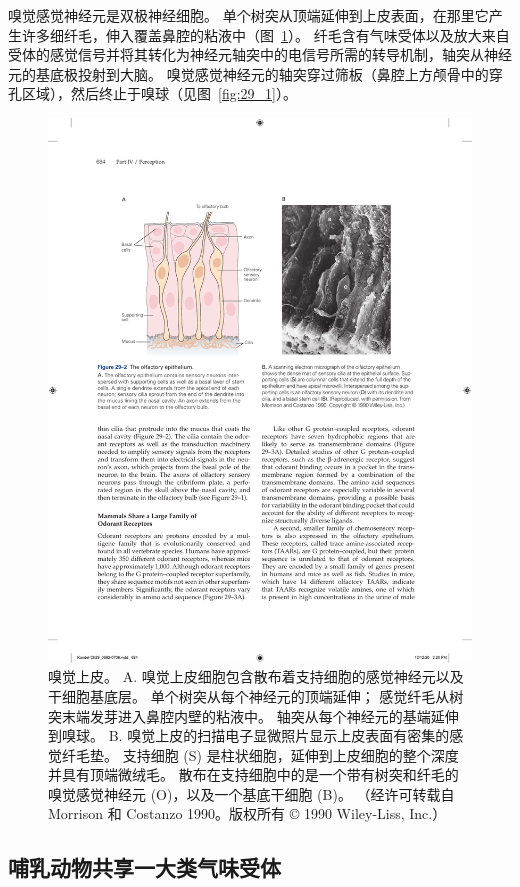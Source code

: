 嗅觉感觉神经元是双极神经细胞。
单个树突从顶端延伸到上皮表面，在那里它产生许多细纤毛，伸入覆盖鼻腔的粘液中（图~\ref{fig:29_2}）。
纤毛含有气味受体以及放大来自受体的感觉信号并将其转化为神经元轴突中的电信号所需的转导机制，轴突从神经元的基底极投射到大脑。
嗅觉感觉神经元的轴突穿过筛板（鼻腔上方颅骨中的穿孔区域），然后终止于嗅球（见图~\ref{fig:29_1}）。


\begin{figure}[htbp]
	\centering
	\includegraphics[width=0.8\linewidth]{chap29/fig_29_2}
	\caption{嗅觉上皮。
	A. 嗅觉上皮细胞包含散布着支持细胞的感觉神经元以及干细胞基底层。
	单个树突从每个神经元的顶端延伸；
	感觉纤毛从树突末端发芽进入鼻腔内壁的粘液中。
	轴突从每个神经元的基端延伸到嗅球。
	B. 嗅觉上皮的扫描电子显微照片显示上皮表面有密集的感觉纤毛垫。
	支持细胞 (S) 是柱状细胞，延伸到上皮细胞的整个深度并具有顶端微绒毛。 散布在支持细胞中的是一个带有树突和纤毛的嗅觉感觉神经元 (O)，以及一个基底干细胞 (B)。 （经许可转载自 Morrison 和 Costanzo 1990。版权所有 © 1990 Wiley-Liss, Inc.）}
	\label{fig:29_2}
\end{figure}



\subsection{哺乳动物共享一大类气味受体}

